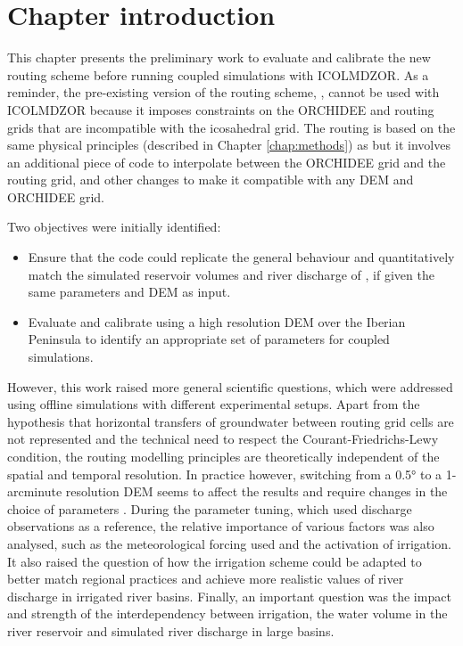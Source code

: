 \section{Chapter introduction}

This chapter presents the preliminary work to evaluate and calibrate the new \native routing scheme before running coupled simulations with ICOLMDZOR. As a reminder, the pre-existing version of the routing scheme, \std, cannot be used with ICOLMDZOR because it imposes constraints on the ORCHIDEE and routing grids that are incompatible with the icosahedral grid. 
The \native routing is based on the same physical principles (described in Chapter \ref{chap:methods}) as \std but it involves an additional piece of code to interpolate between the ORCHIDEE grid and the routing grid, and other changes to make it compatible with any DEM and ORCHIDEE grid.

Two objectives were initially identified:
\begin{itemize}
    \item Ensure that the \native code could replicate the general behaviour and quantitatively match the simulated reservoir volumes and river discharge of \std, if given the same parameters and DEM as input. 
    \item Evaluate and calibrate \native using a high resolution DEM over the Iberian Peninsula to identify an appropriate set of parameters for coupled simulations.
\end{itemize}

However, this work raised more general scientific questions, which were addressed using offline simulations with different experimental setups. Apart from the hypothesis that horizontal transfers of groundwater between routing grid cells are not represented and the technical need to respect the Courant-Friedrichs-Lewy condition, the routing modelling principles are theoretically independent of the spatial and temporal resolution. In practice however, switching from a 0.5° to a 1-arcminute resolution DEM seems to affect the results and require changes in the choice of parameters \citep{kilic_evaluation_2023}. During the parameter tuning, which used discharge observations as a reference, the relative importance of various factors was also analysed, such as the meteorological forcing used and the activation of irrigation. It also raised the question of how the irrigation scheme could be adapted to better match regional practices and achieve more realistic values of river discharge in irrigated river basins. Finally, an important question was the impact and strength of the interdependency between irrigation, the water volume in the river reservoir and simulated river discharge in large basins.

